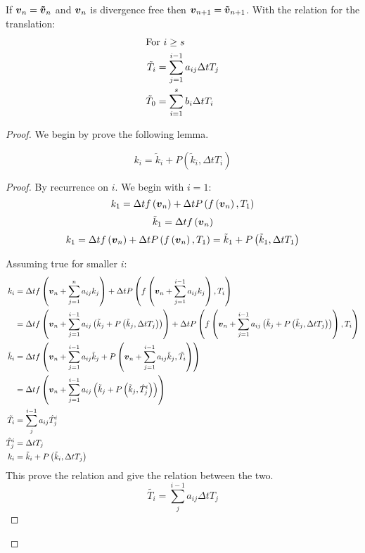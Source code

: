 \begin{theorem}
If ${\boldsymbol {v}}_{n}={\boldsymbol {\tilde{v}}}_{n}$ and ${\boldsymbol {v}}_n$ is divergence free then ${\boldsymbol {v}}_{n+1}={\boldsymbol {\tilde{v}}}_{n+1}$.
With the relation for the translation:
\begin{align}
\intertext{For $i\geq s$}
  \tilde{T}_i&=\sum_{j=1}^{i-1}a_{ij}\Delta t T_{j}\\
  \tilde{T}_0&=\sum_{i=1}^{s}b_{i}\Delta t T_{i}
\end{align}

\end{theorem}
\begin{proof}
We begin by prove the following lemma.
\begin{lemma}
\begin{equation}
  k_{i}=\tilde{k}_{i}+P(\tilde{k}_{i},\Delta t T_{i})
\end{equation}
\end{lemma}
\begin{proof}
By recurrence on $i$.
We begin with $i=1$:
\begin{equation}
  k_{1}=\Delta tf\left({\boldsymbol {v}}_n\right)+\Delta tP\left(f\left({\boldsymbol {v}}_n\right),T_{1}\right)
\end{equation}
\begin{equation}
\tilde{k}_{1}=\Delta tf\left({\boldsymbol {v}}_n\right)
\end{equation}
\begin{equation}
  k_{1}=\Delta t f\left({\boldsymbol {v}}_n\right)+\Delta tP\left(f\left({\boldsymbol {v}}_n\right),T_{1}\right)=\tilde{k}_1+P\left(\tilde{k}_1,\Delta t T_{1}\right)
\end{equation}

Assuming true for smaller $i$:
\begin{align*}
  k_{i}&=\Delta tf\left({\boldsymbol {v}}_n+\sum_{j=1}^{n}a_{ij}k_{j}\right)+\Delta tP\left(f\left({\boldsymbol {v}}_n+\sum_{j=1}^{i-1}a_{ij}k_{j}\right),T_{i}\right)\\
  &=\Delta tf\left({\boldsymbol {v}}_n+\sum_{j=1}^{i-1}a_{ij}\left(\tilde{k}_{j}+P\left(\tilde{k}_{j},\Delta t T_{j}\right)\right)\right)+\Delta tP\left(f\left({\boldsymbol {v}}_n+\sum_{j=1}^{i-1}a_{ij}\left(\tilde{k}_{j}+P\left(\tilde{k}_{j},\Delta t T_{j}\right)\right)\right),T_{i}\right)\\
  \tilde{k}_{i}&=\Delta tf\left({\boldsymbol {v}}_n+\sum_{j=1}^{i-1}a_{ij}\tilde{k}_{j}+P\left({\boldsymbol {v}}_n+\sum_{j=1}^{i-1}a_{ij}\tilde{k}_{j},\tilde{T}_{i}\right)\right)\\
  &=\Delta tf\left({\boldsymbol {v}}_n+\sum_{j=1}^{i-1}a_{ij}\left(\tilde{k}_{j}+P\left(\tilde{k}_{j},\hat{T}_{j}^{i}\right)\right)\right)\\
  \tilde{T_i}&=\sum_{j}^{i-1}a_{ij}\hat{T}_{j}^{i}\\
  \hat{T}^{i}_{j}&=\Delta t T_{j}\\
  k_{i}&=\tilde{k}_{i}+P\left(\tilde{k}_{i},\Delta tT_j\right)
\end{align*}
This prove the relation and give the relation between the two.
\begin{equation}
  \tilde{T_i}=\sum_{j}^{i-1}a_{ij}\Delta t T_{j}
\end{equation}
\end{proof}


\end{proof}
